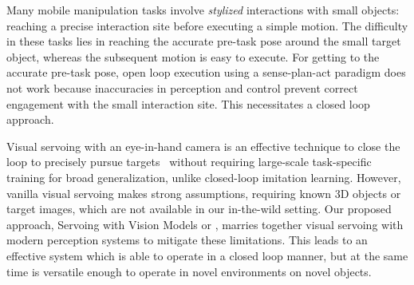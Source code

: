 Many  mobile manipulation tasks  involve {\it stylized} interactions with small objects: reaching a precise interaction site before executing a simple motion. 
The difficulty in these tasks lies in reaching the accurate pre-task pose around the small target object, 
whereas the subsequent motion is easy to execute.
For getting to the accurate pre-task pose, open loop execution using a sense-plan-act
paradigm does not work because inaccuracies in perception and control prevent
correct engagement with the small interaction site. 
This necessitates a closed loop
approach.  






Visual servoing with an eye-in-hand camera is an effective
technique to close the loop to precisely pursue
targets~\cite{chaumette2016visual}
without requiring large-scale task-specific training for broad generalization, 
unlike closed-loop imitation learning.
However, vanilla visual servoing makes
strong assumptions, \eg requiring known 3D objects or target images, which are
not available in our in-the-wild setting. Our proposed approach, Servoing with 
Vision Models or \name, marries together
visual servoing with modern perception systems to mitigate these limitations.
This leads to an effective system which is able to operate in a closed loop
manner, but at the same time is versatile enough to operate in novel
environments on novel objects.


